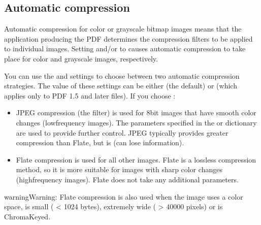 \documentclass[letterpaper,12pt,english,openany,oneside]{sphinxmanual}
\begin{document}
\subsection{Automatic compression}
\label{\detokenize{PDF_Create_UsingSettings:automatic-compression}}
Automatic compression for color or grayscale bitmap images means that the application producing the PDF determines the compression filters to be applied to individual images. Setting  and/or  to  causes automatic compression to take place for color and grayscale images, respectively.

You can use the  and  settings to choose between two automatic compression strategies. The value of these settings can be either  (the default) or  (which applies only to PDF 1.5 and later files). If you choose  :
\begin{itemize}
\item {} 
JPEG compression (the  filter) is used for 8\sphinxhyphen{}bit images that have smooth color changes (low\sphinxhyphen{}frequency images). The parameters specified in the  or  dictionary are used to provide further control. JPEG typically provides greater compression than Flate, but is  (can lose information).

\item {} 
Flate compression is used for all other images. Flate is a lossless compression method, so it is more suitable for images with sharp color changes (high\sphinxhyphen{}frequency images). Flate does not take any additional parameters.

\end{itemize}

\begin{sphinxadmonition}{warning}{Warning:}
Flate compression is also used when the image uses a  color space, is small ( < 1024 bytes), extremely wide ( > 40000 pixels) or is ChromaKeyed.
\end{sphinxadmonition}
\end{document}

